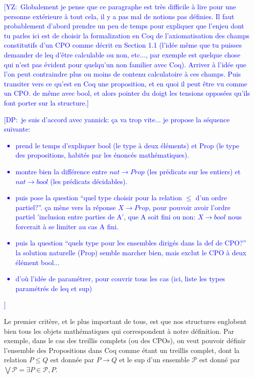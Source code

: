 \documentclass{article}
\newcommand{\yz}[1]{\textcolor{blue}{{[YZ:~#1]}}}
\newcommand\dam[1]{\textcolor{blue}{{[DP:~#1]}}}
\theoremstyle{definition}
\begin{document}
\yz{Globalement je pense que ce paragraphe est très difficile à lire pour une
  personne extérieure à tout cela, il y a pas mal de notions pas définies.
  Il faut probablement d'abord prendre un peu
  de temps pour expliquer que l'enjeu dont tu parles ici est de choisir
  la formalization en Coq de l'axiomatisation des champs constitutifs d'un CPO
  comme décrit en Section 1.1 (l'idée même que tu puisses demander de leq d'être
  calculable ou non, etc..., par exemple est quelque chose qui n'est pas évident pour
  quelqu'un non familier avec Coq). Arriver à l'idée que l'on peut contraindre plus
  ou moins de contenu calculatoire à ces champs. Puis transiter vers ce qu'est
  en Coq une proposition, et en quoi il peut être vu comme un CPO. de même avec
  bool, et alors pointer du doigt les tensions opposées qu'ils font porter sur
  la structure.}

\dam{je suis d'accord avec yannick: ça va trop vite... je propose la séquence suivante:
  \begin{itemize}
  \item prend le temps d'expliquer bool (le type à deux éléments) et
    Prop (le type des propositions, habités par les énoncés
    mathématiques).  
  \item montre bien la différence entre $nat\to Prop$
    (les prédicats sur les entiers) et $nat\to bool$ (les prédicats
    décidables).  
  \item puis pose la question ``quel type choisir pour la
    relation $\leq$ d'un ordre partiel?''.
    ça mène vers la réponse $X\to Prop$, pour pouvoir avoir l'ordre partiel 'inclusion entre parties de A', que A soit fini ou non: $X\to bool$ nous forcerait à se limiter au cas A fini.
  \item puis la question ``quels type pour les ensembles dirigés dans la def de CPO?''
    la solution naturelle (Prop) semble marcher bien, mais exclut le CPO à deux élément bool...
  \item d'où l'idée de paramétrer, pour couvrir tous les cas
    (ici, liste les types paramétrés de leq et sup)
  \end{itemize}
}
Le premier critère, et le plus important de tous, est que nos structures englobent bien tous les objets mathématiques qui correspondent à notre définition. Par exemple, dans le cas des treillis complets (ou des CPOs), on veut pouvoir définir l'ensemble des Propositions dans Coq comme étant un treillis complet, dont la relation $P \leq Q$ est donnée par $P \rightarrow Q$ et le sup d'un ensemble $\mathcal{P}$ est donné par $\bigvee \mathcal{P} = \exists P \in \mathcal{P}, P$. 
\end{document}
